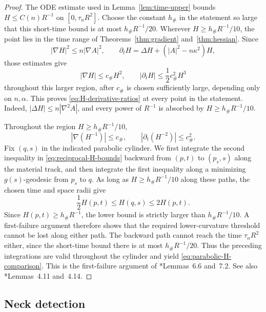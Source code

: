 \documentclass[11pt,reqno]{amsart}
\theoremstyle{definition}
\theoremstyle{remark}
\numberwithin{equation}{section}
\begin{document}
\begin{proof}
The ODE estimate used in Lemma~\ref{lem:time-upper} bounds
$H\leq C(n)R^{-1}$ on $[0,\tau_nR^2]$.  Choose the constant $h_\#$ in the
statement so large that this short-time bound is at most
$h_\#R^{-1}/20$.  Wherever $H\geq h_\#R^{-1}/10$, the point lies in the
time range of Theorems~\ref{thm:gradient} and~\ref{thm:hessian}.  Since
\begin{equation*}
 |\nabla H|^2\leq n|\nabla A|^2,
 \qquad
 \partial_tH=\Delta H+(|A|^2-n\kappa^2)H,
\end{equation*}
those estimates give
\begin{equation*}
 |\nabla H|\leq c_\#H^2,
 \qquad
 |\partial_tH|\leq\frac12c_\#^2H^3
\end{equation*}
throughout this larger region, after $c_\#$ is chosen sufficiently large,
depending only on $n,\alpha$.  This proves
\eqref{eq:H-derivative-ratios} at every point in the statement.
Indeed, $|\Delta H|\leq n|\nabla^2A|$, and every power of $R^{-1}$ is
absorbed by $H\geq h_\#R^{-1}/10$.

Throughout the region $H\geq h_\#R^{-1}/10$,
\begin{equation}\label{eq:reciprocal-H-bounds}
 |\nabla(H^{-1})|\leq c_\#,
 \qquad
 |\partial_t(H^{-2})|\leq c_\#^2.
\end{equation}
Fix $(q,s)$ in the indicated parabolic cylinder.  We first integrate the second inequality in
\eqref{eq:reciprocal-H-bounds} backward from $(p,t)$ to $(p_s,s)$
along the material track, and then integrate the first inequality
along a minimizing $g(s)$-geodesic from $p_s$ to $q$.  As long as
$H\geq h_\#R^{-1}/10$ along these paths, the chosen time and space
radii give
\begin{equation*}
    \frac12 H(p,t)\leq H(q,s)\leq2H(p,t).
\end{equation*}
Since $H(p,t)\geq h_\#R^{-1}$, the lower bound is strictly larger than
$h_\#R^{-1}/10$.  A first-failure argument therefore shows that the
required lower-curvature threshold cannot be lost along either path. The backward path cannot reach the time $\tau_nR^2$ either, since the
short-time bound there is at most $h_\#R^{-1}/20$.  Thus the preceding
integrations are valid throughout the cylinder and yield
\eqref{eq:parabolic-H-comparison}. This is the first-failure
argument of \cite{HS09}*{Lemmas~6.6 and~7.2}.  See also
\cite{LN21}*{Lemmas~4.11 and~4.14}.
\end{proof}

\subsection{Neck detection}
\end{document}
